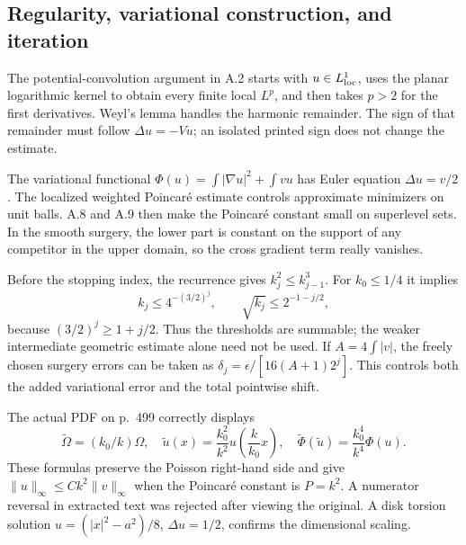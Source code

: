 \documentclass[10pt]{article}
\begin{document}
\subsection*{Regularity, variational construction, and iteration}
The potential-convolution argument in A.2 starts with \(u\in L^1_{\rm loc}\), uses the planar logarithmic kernel to obtain every finite local \(L^p\), and then takes \(p>2\) for the first derivatives. Weyl’s lemma handles the harmonic remainder. The sign of that remainder must follow \(\Delta u=-Vu\); an isolated printed sign does not change the estimate.\par
The variational functional \(\Phi(u)=\int|\nabla u|^2+\int vu\) has Euler equation \(\Delta u=v/2\). The localized weighted Poincaré estimate controls approximate minimizers on unit balls. A.8 and A.9 then make the Poincaré constant small on superlevel sets. In the smooth surgery, the lower part is constant on the support of any competitor in the upper domain, so the cross gradient term really vanishes.\par
Before the stopping index, the recurrence gives \(k_j^2\le k_{j-1}^3\). For \(k_0\le1/4\) it implies \[k_j\le4^{-(3/2)^j},\qquad
 \sqrt{k_j}\le2^{-1-j/2},\] because \((3/2)^j\ge1+j/2\). Thus the thresholds are summable; the weaker intermediate geometric estimate alone need not be used. If \(A=4\int|v|\), the freely chosen surgery errors can be taken as \(\delta_j=\epsilon/[16(A+1)2^j]\). This controls both the added variational error and the total pointwise shift.\par
The actual PDF on p. 499 correctly displays \[\widetilde\Omega=(k_0/k)\Omega,\quad
 \widetilde u(x)=\frac{k_0^2}{k^2}u\!\left(\frac{k}{k_0}x\right),\quad
 \widetilde\Phi(\widetilde u)=\frac{k_0^4}{k^4}\Phi(u).\] These formulas preserve the Poisson right-hand side and give \(\|u\|_\infty\le Ck^2\|v\|_\infty\) when the Poincaré constant is \(P=k^2\). A numerator reversal in extracted text was rejected after viewing the original. A disk torsion solution \(u=(|x|^2-a^2)/8\), \(\Delta u=1/2\), confirms the dimensional scaling.\par
\end{document}
